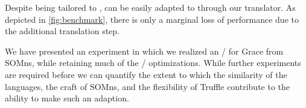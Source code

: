 Despite being tailored to \Newspeak, \SOMns can be easily adapted to \Grace through our translator. As depicted in \autoref{fig:benchmark}, there is only a marginal loss of performance due to the additional translation step. 



We have presented an experiment in which we realized an \VM/ for Grace from SOMns, while retaining much of the \AST/ optimizations. While further experiments are required before we can quantify the extent to which the similarity of the languages, the craft of SOMns, and the flexibility of Truffle contribute to the ability to make such an adaption. 


